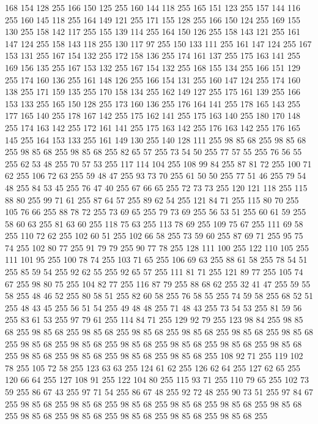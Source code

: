 168 154 128 255 166 150 125 255 160 144 118 255 165 151 123 255 157 144 116 255 160 145 118 255 164 149 121 255 171 155 128 255 166 150 124 255 169 155 130 255 158 142 117 255 155 139 114 255 164 150 126 255 158 143 121 255 161 147 124 255 158 143 118 255 130 117 97 255 150 133 111 255 161 147 124 255 167 153 131 255 167 154 132 255 172 158 136 255 174 161 137 255 175 163 141 255 169 156 135 255 167 153 132 255 167 154 132 255 168 155 134 255 166 151 129 255 174 160 136 255 161 148 126 255 166 154 131 255 160 147 124 255 174 160 138 255 171 159 135 255 170 158 134 255 162 149 127 255 175 161 139 255 166 153 133 255 165 150 128 255 173 160 136 255 176 164 141 255 178 165 143 255 177 165 140 255 178 167 142 255 175 162 141 255 175 163 140 255 180 170 148 255 174 163 142 255 172 161 141 255 175 163 142 255 176 163 142 255 176 165 145 255 164 153 133 255 161 149 130 255 140 128 111 255 98 85 68 255 98 85 68 255 98 85 68 255 98 85 68 255 82 65 57 255 73 54 50 255 77 57 55 255 76 56 55 255
62 53 48 255 70 57 53 255 117 114 104 255 108 99 84 255 87 81 72 255 100 71 62 255 106 72 63 255 59 48 47 255 93 73 70 255 61 50 50 255 77 51 46 255 79 54 48 255 84 53 45 255 76 47 40 255 67 66 65 255 72 73 73 255 120 121 118 255 115 88 80 255 99 71 61 255 87 64 57 255 89 62 54 255 121 84 71 255 115 80 70 255 105 76 66 255 88 78 72 255 73 69 65 255 79 73 69 255 56 53 51 255 60 61 59 255 58 60 63 255 81 63 60 255 118 75 63 255 113 78 69 255 109 75 67 255 111 69 58 255 110 72 62 255 102 60 51 255 102 66 58 255 73 59 60 255 87 69 71 255 95 75 74 255 102 80 77 255 91 79 79 255 90 77 78 255 128 111 100 255 122 110 105 255 111 101 95 255 100 78 74 255 103 71 65 255 106 69 63 255 88 61 58 255 78 54 51 255 85 59 54 255 92 62 55 255 92 65 57 255 111 81 71 255 121 89 77 255 105 74 67 255 98 80 75 255 104 82 77 255 116 87 79 255 88 68 62 255 32 41 47 255 59 55 58 255
48 46 52 255 80 58 51 255 82 60 58 255 76 58 55 255 74 59 58 255 68 52 51 255 48 43 45 255 56 51 54 255 49 48 48 255 71 48 43 255 73 54 53 255 81 59 56 255 83 61 53 255 97 79 61 255 114 84 71 255 129 92 79 255 123 98 84 255 98 85 68 255 98 85 68 255 98 85 68 255 98 85 68 255 98 85 68 255 98 85 68 255 98 85 68 255 98 85 68 255 98 85 68 255 98 85 68 255 98 85 68 255 98 85 68 255 98 85 68 255 98 85 68 255 98 85 68 255 98 85 68 255 98 85 68 255 108 92 71 255 119 102 78 255 105 72 58 255 123 63 63 255 124 61 62 255 126 62 64 255 127 62 65 255 120 66 64 255 127 108 91 255 122 104 80 255 115 93 71 255 110 79 65 255 102 73 59 255 86 67 43 255 97 71 54 255 86 67 48 255 92 72 48 255 90 73 51 255 97 84 67 255 98 85 68 255 98 85 68 255 98 85 68 255 98 85 68 255 98 85 68 255 98 85 68 255 98 85 68 255 98 85 68 255 98 85 68 255 98 85 68 255 98 85 68 255
